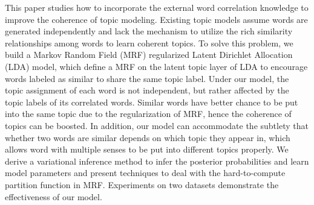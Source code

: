 This paper studies how to incorporate the external word correlation knowledge to improve the coherence of topic modeling. Existing topic models assume words are generated independently and lack the mechanism to utilize the rich similarity relationships among words to learn coherent topics. To solve this problem, we build a Markov Random Field (MRF) regularized Latent Dirichlet Allocation (LDA) model, which define a MRF on the latent topic layer of LDA to encourage words labeled as similar to share the same topic label. Under our model, the topic assignment of each word is not independent, but rather affected by the topic labels of its correlated words. Similar words have better chance to be put into the same topic due to the regularization of MRF, hence the coherence of topics can be boosted. In addition, our model can accommodate the subtlety that whether two words are similar depends on which topic they appear in, which allows word with multiple senses to be put into different topics properly. We derive a variational inference method to infer the posterior probabilities and learn model parameters and present techniques to deal with the hard-to-compute partition function in MRF. Experiments on two datasets demonstrate the effectiveness of our model.
